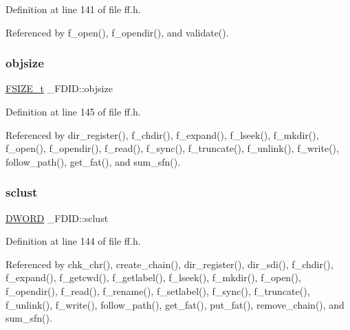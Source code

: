 Definition at line 141 of file ff.\+h.



Referenced by f\+\_\+open(), f\+\_\+opendir(), and validate().

\mbox{\label{struct__FDID_a27039b8d89a4a62efabab36e6b303819}} 
\subsubsection{\texorpdfstring{objsize}{objsize}}
{\footnotesize\ttfamily \hyperlink{ff_8h_a3fc0992ad7436250b6b1a0592214b7f2}{F\+S\+I\+Z\+E\+\_\+t} \+\_\+\+F\+D\+I\+D\+::objsize}



Definition at line 145 of file ff.\+h.



Referenced by dir\+\_\+register(), f\+\_\+chdir(), f\+\_\+expand(), f\+\_\+lseek(), f\+\_\+mkdir(), f\+\_\+open(), f\+\_\+opendir(), f\+\_\+read(), f\+\_\+sync(), f\+\_\+truncate(), f\+\_\+unlink(), f\+\_\+write(), follow\+\_\+path(), get\+\_\+fat(), and sum\+\_\+sfn().

\mbox{\label{struct__FDID_ae2fbaaa31b5d12b333cb6d1ded099412}} 
\subsubsection{\texorpdfstring{sclust}{sclust}}
{\footnotesize\ttfamily \hyperlink{integer_8h_ad342ac907eb044443153a22f964bf0af}{D\+W\+O\+RD} \+\_\+\+F\+D\+I\+D\+::sclust}



Definition at line 144 of file ff.\+h.



Referenced by chk\+\_\+chr(), create\+\_\+chain(), dir\+\_\+register(), dir\+\_\+sdi(), f\+\_\+chdir(), f\+\_\+expand(), f\+\_\+getcwd(), f\+\_\+getlabel(), f\+\_\+lseek(), f\+\_\+mkdir(), f\+\_\+open(), f\+\_\+opendir(), f\+\_\+read(), f\+\_\+rename(), f\+\_\+setlabel(), f\+\_\+sync(), f\+\_\+truncate(), f\+\_\+unlink(), f\+\_\+write(), follow\+\_\+path(), get\+\_\+fat(), put\+\_\+fat(), remove\+\_\+chain(), and sum\+\_\+sfn().

\mbox{\label{struct__FDID_a1a2ff09f2ef172772f4e7312070be708}} 
